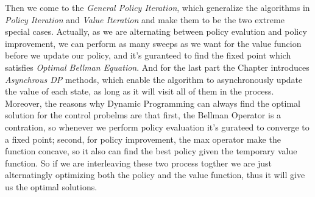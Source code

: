 \documentclass[12pt,a4paper]{article}
\begin{document}
Then we come to the \textit{General Policy Iteration}, which generalize the algorithms in \textit{Policy Iteration} and \textit{Value Iteration} and make them to be the two extreme special cases. Actually, as we are alternating between policy evalution and policy improvement, we can perform as many sweeps as we want for the value funcion before we update our policy, and it's guranteed to find the fixed point which satisfies \textit{Optimal Bellman Equation}. And for the last part the Chapter introduces \textit{Asynchrous DP} methods, which enable the algorithm to asynchronously update the value of each state, as long as it will visit all of them in the process.\\

Moreover, the reasons why Dynamic Programming can always find the optimal solution for the control probelms are that first, the Bellman Operator is a contration, so whenever we perform policy evaluation it's gurateed to converge to a fixed point; second, for policy improvement, the max operator make the function concave, so it also can find the best policy given the temporary value function. So if we are interleaving these two process togther we are just alternatingly optimizing both the policy and the value function, thus it will give us the optimal solutions.
\end{document}
